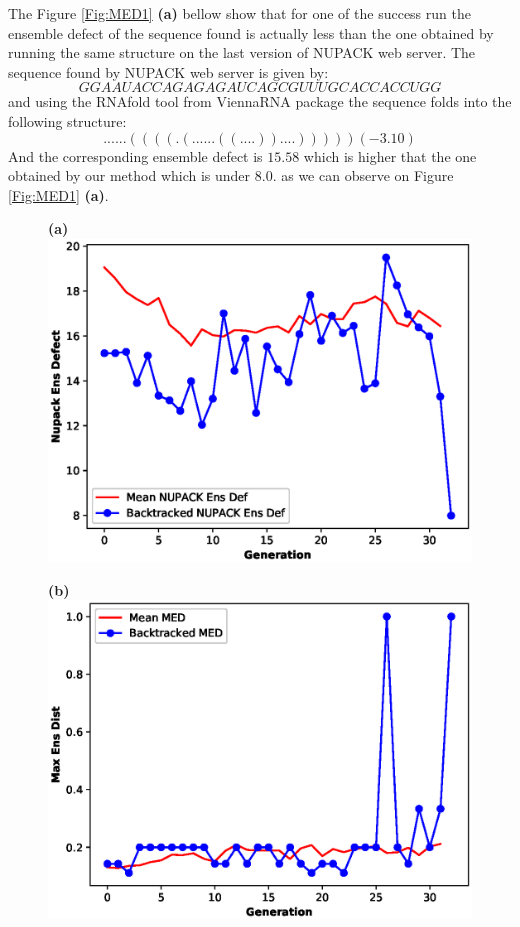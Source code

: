 \documentclass[english,12pt,a4paper]{article}
\theoremstyle{definition}
\begin{document}
The Figure \ref{Fig:MED1} \textbf{(a)} bellow show that for one of the success run the ensemble defect of the sequence found is actually less than the one obtained by running the same structure on the last version of NUPACK web server. The sequence found by NUPACK web server is given by: $$GGAAUACCAGAGAGAUCAGCGUUUGCACCACCUGG$$ and using the RNAfold tool from ViennaRNA package the sequence folds into the following structure:
$$......((((.(......((....))....))))) ( -3.10)$$
And the corresponding  ensemble defect is $15.58$ which is higher that the one obtained by our method which is under $8.0$. as we can observe on Figure \ref{Fig:MED1} \textbf{(a)}.
\begin{figure}[H] 
	\vspace{-0.3cm}
	\hspace{-1.2cm}
	\begin{minipage}{0.60\textwidth}
		\centering
		\textbf{(a)}\label{Fig:small1}
		\includegraphics[width=.9\linewidth]{images/stat1-65}
	\end{minipage}\hfill
	\begin{minipage}{0.6\textwidth}
		\centering
		
		\textbf{(b)}\label{Fig:small2}
		\includegraphics[width=.9\linewidth]{images/stat4-65}
	\end{minipage}
	

\end{figure}
\end{document}
